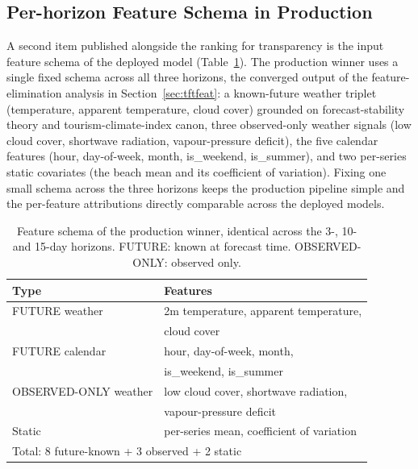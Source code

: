 \documentclass[twocolumn,twoside,a4paper,10pt]{IEEEtran}
\begin{document}
\subsection{Per-horizon Feature Schema in Production}\label{sec:prodfeat}

A second item published alongside the ranking for transparency is the input feature schema of the deployed model (Table~\ref{tab:prod_features}). The production winner uses a single fixed schema across all three horizons, the converged output of the feature-elimination analysis in Section~\ref{sec:tftfeat}: a known-future weather triplet (temperature, apparent temperature, cloud cover) grounded on forecast-stability theory and tourism-climate-index canon, three observed-only weather signals (low cloud cover, shortwave radiation, vapour-pressure deficit), the five calendar features (hour, day-of-week, month, is\_weekend, is\_summer), and two per-series static covariates (the beach mean and its coefficient of variation). Fixing one small schema across the three horizons keeps the production pipeline simple and the per-feature attributions directly comparable across the deployed models.

\begin{table}[!ht]
    \caption{Feature schema of the production winner, identical across the 3-, 10- and 15-day horizons. FUTURE: known at forecast time. OBSERVED-ONLY: observed only.}
    \label{tab:prod_features}
    \begin{center}
    \footnotesize
    \begin{tabular}{ll}
        \toprule
        Type & Features \\
        \midrule
        FUTURE weather  & 2m temperature, apparent temperature, \\
              & \quad cloud cover \\
        FUTURE calendar & hour, day-of-week, month, \\
              & \quad is\_weekend, is\_summer \\
        OBSERVED-ONLY weather  & low cloud cover, shortwave radiation, \\
                      & \quad vapour-pressure deficit \\
        Static        & per-series mean, coefficient of variation \\
        \midrule
        \multicolumn{2}{l}{Total: 8 future-known + 3 observed + 2 static} \\
        \bottomrule
    \end{tabular}
    \end{center}
\end{table}
\end{document}
